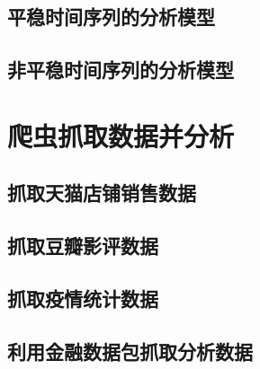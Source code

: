 \section{平稳时间序列的分析模型}
\section{非平稳时间序列的分析模型}


\chapter{爬虫抓取数据并分析}
\section{抓取天猫店铺销售数据}
\section{抓取豆瓣影评数据}
\section{抓取疫情统计数据}
\section{利用金融数据包抓取分析数据}
